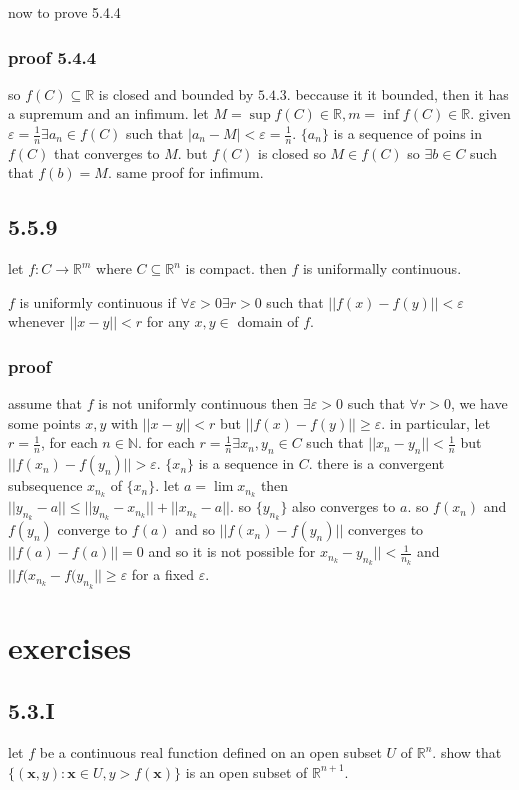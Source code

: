 \documentclass[letterpaper]{article}
\begin{document}
now to prove 5.4.4

\subsubsection*{proof 5.4.4}
so $f(C)\subseteq\mathbb{R}$ is closed and bounded by $5.4.3$. beccause it it bounded, then it has a supremum and an infimum. let $M=\sup f(C)\in \mathbb{R}, m=\inf f(C)\in \mathbb{R}$. given $\varepsilon=\frac{1}{n}\exists a_n\in f(C)$ such that $|a_n-M|<\varepsilon=\frac{1}{n}$. $\{a_n\}$ is a sequence of poins in $f(C)$ that converges to $M$. but $f(C)$ is closed so $M\in f(C)$ so $\exists b\in C$ such that $f(b)=M$. same proof for infimum.

\subsection*{5.5.9}
let $f:C\to\mathbb{R}^m$ where $C\subseteq\mathbb{R}^n$ is compact. then $f$ is uniformally continuous.

$f$ is uniformly continuous if $\forall\varepsilon>0\exists r>0$ such that $||f(x)-f(y)||<\varepsilon$ whenever $||x-y||<r$ for any $x,y\in$ domain of $f$.

\subsubsection*{proof}
assume that $f$ is not uniformly continuous then $\exists \varepsilon>0$ such that $\forall r>0$, we have some points $x,y$ with $||x-y||<r$ but $||f(x)-f(y)||\ge \varepsilon$. in particular, let $r=\frac{1}{n}$, for each $n\in \mathbb{N}$. for each $r=\frac{1}{n}\exists x_n,y_n\in C$ such that $||x_n-y_n||<\frac{1}{n}$ but $||f(x_n)-f(y_n)||>\varepsilon$. $\{x_n\}$ is a sequence in $C$. there is a convergent subsequence $x_{n_k}$ of $\{x_n\}$. let $a=\lim x_{n_k}$ then $||y_{n_k}-a||\le||y_{n_k}-x_{n_k}||+||x_{n_k}-a||$. so $\{y_{n_k}\}$ also converges to $a$. so $f(x_n)$ and $f(y_n)$ converge to $f(a)$ and so $||f(x_n)-f(y_n)||$ converges to $||f(a)-f(a)||=0$ and so it is not possible for $x_{n_k}-y_{n_k}||<\frac{1}{n_k}$ and $||f(x_{n_k}-f(y_{n_k}||\ge \varepsilon$ for a fixed $\varepsilon$.

\section*{exercises}
\subsection*{5.3.I}
let $f$ be a continuous real function defined on an open subset $U$ of $\mathbb{R}^n$. show that $\{(\boldsymbol{x},y):\boldsymbol{x}\in U,y>f(\boldsymbol{x})\}$ is an open subset of $\mathbb{R}^{n+1}$.
\end{document}
